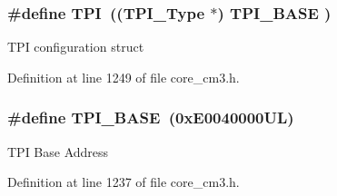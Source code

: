 \subsubsection[{\texorpdfstring{T\+PI}{TPI}}]{\setlength{\rightskip}{0pt plus 5cm}\#define T\+PI~(({\bf T\+P\+I\+\_\+\+Type}       $\ast$)     {\bf T\+P\+I\+\_\+\+B\+A\+SE}      )}\hypertarget{group__CMSIS__core__base_ga8b4dd00016aed25a0ea54e9a9acd1239}{}\label{group__CMSIS__core__base_ga8b4dd00016aed25a0ea54e9a9acd1239}
T\+PI configuration struct 

Definition at line 1249 of file core\+\_\+cm3.\+h.

\subsubsection[{\texorpdfstring{T\+P\+I\+\_\+\+B\+A\+SE}{TPI_BASE}}]{\setlength{\rightskip}{0pt plus 5cm}\#define T\+P\+I\+\_\+\+B\+A\+SE~(0x\+E0040000\+U\+L)}\hypertarget{group__CMSIS__core__base_ga2b1eeff850a7e418844ca847145a1a68}{}\label{group__CMSIS__core__base_ga2b1eeff850a7e418844ca847145a1a68}
T\+PI Base Address 

Definition at line 1237 of file core\+\_\+cm3.\+h.

